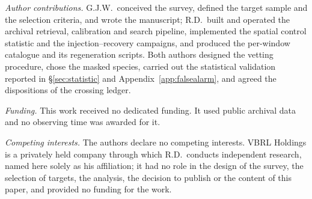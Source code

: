 \emph{Author contributions.} G.J.W.\ conceived the survey, defined the target
sample and the selection criteria, and wrote the manuscript; R.D.\ built and
operated the archival retrieval, calibration and search pipeline, implemented
the spatial control statistic and the injection--recovery campaigns, and
produced the per-window catalogue and its regeneration scripts. Both authors
designed the vetting procedure, chose the masked species, carried out the
statistical validation reported in \S\ref{sec:statistic} and
Appendix~\ref{app:falsealarm}, and agreed the dispositions of the crossing
ledger.

\emph{Funding.} This work received no dedicated funding. It used public archival data and
no observing time was awarded for it.

\emph{Competing interests.} The authors declare no competing interests. VBRL Holdings is a privately
held company through which R.D.\ conducts independent research, named
here solely as his affiliation; it had no role in the design of the
survey, the selection of targets, the analysis, the decision to publish
or the content of this paper, and provided no funding for the work.

